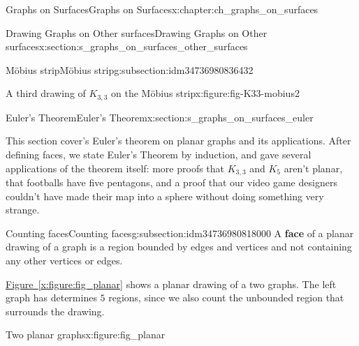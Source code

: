 \documentclass[oneside,10pt,]{book}
\newcommand{\xreffont}{\relax}
\newcommand{\terminology}[1]{\textbf{#1}}
\numberwithin{equation}{section}
\begin{document}
\begin{chapterptx}{Graphs on Surfaces}{}{Graphs on Surfaces}{}{}{x:chapter:ch_graphs_on_surfaces}
\begin{sectionptx}{Drawing Graphs on Other surfaces}{}{Drawing Graphs on Other surfaces}{}{}{x:section:s_graphs_on_surfaces_other_surfaces}
\begin{subsectionptx}{Möbius strip}{}{Möbius strip}{}{}{g:subsection:idm34736980836432}
\begin{figureptx}{A third drawing of \(K_{3,3}\) on the Möbius strip}{x:figure:fig-K33-mobius2}{}
\begin{image}{0}{1}{0}
{\begin{tikzpicture}
\end{tikzpicture}
}%
\end{image}%
\tcblower
\end{figureptx}%
\end{subsectionptx}
\end{sectionptx}
%
%
\typeout{************************************************}
\typeout{************************************************}
%
\begin{sectionptx}{Euler's Theorem}{}{Euler's Theorem}{}{}{x:section:s_graphs_on_surfaces_euler}
\begin{introduction}{}%
This section cover's Euler's theorem on planar graphs and its applications. After defining faces, we state Euler's Theorem by induction, and gave several applications of the theorem itself: more proofs that \(K_{3,3}\) and \(K_5\) aren't planar, that footballs have five pentagons, and a proof that our video game designers couldn't have made their map into a sphere without doing something very strange.%
\end{introduction}%
%
%
\typeout{************************************************}
\typeout{************************************************}
%
\begin{subsectionptx}{Counting faces}{}{Counting faces}{}{}{g:subsection:idm34736980818000}
A \terminology{face} of a planar drawing of a graph is a region bounded by edges and vertices and not containing any other vertices or edges.%
\par
\hyperref[x:figure:fig_planar]{Figure~{\xreffont\ref{x:figure:fig_planar}}} shows a planar drawing of a two graphs. The left graph has determines \(5\) regions, since we also count the unbounded region that surrounds the drawing.%
\begin{figureptx}{Two planar graphs}{x:figure:fig_planar}{}%
\begin{image}{0}{1}{0}%
\end{image}
\end{figureptx}
\end{subsectionptx}
\end{sectionptx}
\end{chapterptx}
\end{document}
